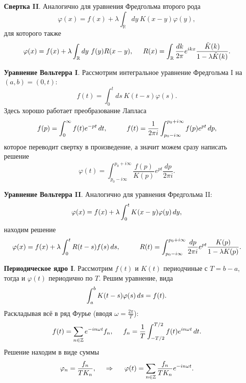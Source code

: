 \textbf{Свертка II}. Аналогично для уравнения Фредгольма второго рода
\begin{equation}
	\varphi(x) = f(x) + \lambda \int_{\mathbb{R}} dy\ K(x-y) \varphi(y),
\end{equation}
для которого также
\begin{equation}
	\varphi(x) = f(x) + \lambda \int_{\mathbb{R}} dy\ f(y) R(x-y),
	\hspace{5 mm} 
	R(x) = \int_{\mathbb{R}} \frac{dk}{2\pi} e^{ik x} \frac{\tilde{K}(k)}{1-\lambda \tilde{K}(k)}.
\end{equation}

\textbf{Уравнение Вольтерра I}. Рассмотрим интегральное уравнение Фредгольма I на $(a,b) = (0, t)$:
\begin{equation*}
	f(t) = \int_{0}^{t} ds\ K(t-s) \varphi(s).
\end{equation*}
Здесь хорошо работает преобразование Лапласа 
\begin{equation*}
	f(p) = \int_{0}^{\infty}  f(t) e^{-pt} \d t,
	\hspace{10 mm} 
	f(t) = \frac{1}{2 \pi i}\int_{p_0 - i \infty}^{p_0 + i \infty} f(p) e^{pt} \d p,
\end{equation*}
которое переводит свертку в произведение, а значит можем сразу написать решение
\begin{equation}
	\varphi(t)  = \int_{p_0 - i \infty}^{p_0 + i \infty} \frac{f(p)}{K(p)} e^{pt} \frac{dp}{2\pi i}.
\end{equation}

\textbf{Уравнение Вольтерра II}.
Аналогично для уравнения Фредгольма II:
\begin{equation}
	\varphi(x) = f(x) + \lambda \int_{0}^{t} K(x-y) \varphi(y) \, d y,
\end{equation}
находим решение
\begin{equation*}
	\varphi(x) = f(x) + \lambda \int_{0}^{t} R(t-s) f(s) \d s,
	\hspace{10 mm} 
	R(t) = \int_{p_0 - i \infty}^{p_0 + i \infty} \frac{dp}{2\pi i} e^{pt} \frac{K(p)}{1-\lambda K(p)}.
\end{equation*}



\textbf{Периодическое ядро I}. Рассмотрим $f(t)$ и $K(t)$ периодчиные с $T = b-a$, тогда и $\varphi(t)$ периодично по $T$. Решим уравнение, вида
\begin{equation}
	\int_{a}^{b} K(t-s) \varphi(s) \, d s = f(t).
\end{equation}
Раскладывая всё в ряд Фурье (вводя $\omega = \frac{2\pi}{T}$):
\begin{equation*}
	f(t) = \sum_{n \in \mathbb{Z}} e^{-in \omega t} f_n,
	\hspace{5 mm} f_n = \frac{1}{T} \int_{-T/2}^{T/2} f(t) e^{i n \omega t} \, d t.
\end{equation*}
Решение находим в виде суммы
\begin{equation}
	\varphi_n = \frac{f_n}{T K_n},
	\hspace{0.5cm} \Rightarrow \hspace{0.5cm}
	\varphi(t) = \sum_{n \in \mathbb{Z}} \frac{f_n}{T K_n} e^{-i n \omega t}.
\end{equation}

